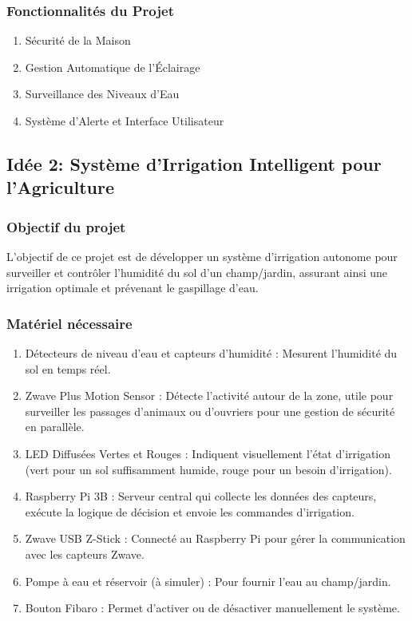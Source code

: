 \documentclass[a4paper ,10pt]{article}
\begin{document}
\subsubsection*{Fonctionnalités du Projet}

\begin{enumerate}
  \item Sécurité de la Maison
  \item Gestion Automatique de l'Éclairage
  \item Surveillance des Niveaux d'Eau
  \item Système d'Alerte et Interface Utilisateur
\end{enumerate}

\newpage

\subsection*{Idée 2: Système d’Irrigation Intelligent pour l’Agriculture}

\subsubsection*{Objectif du projet}
L'objectif de ce projet est de développer un système d'irrigation autonome pour surveiller et contrôler l'humidité du sol d'un champ/jardin, assurant ainsi une irrigation optimale et prévenant le gaspillage d'eau.

\subsubsection*{Matériel nécessaire}

\begin{enumerate}
  \item Détecteurs de niveau d'eau et capteurs d'humidité : Mesurent l'humidité du sol en temps réel.
  \item Zwave Plus Motion Sensor : Détecte l'activité autour de la zone, utile pour surveiller les passages d’animaux ou d’ouvriers pour une gestion de sécurité en parallèle.
  \item LED Diffusées Vertes et Rouges : Indiquent visuellement l'état d'irrigation (vert pour un sol suffisamment humide, rouge pour un besoin d'irrigation).
  \item Raspberry Pi 3B : Serveur central qui collecte les données des capteurs, exécute la logique de décision et envoie les commandes d'irrigation.
  \item Zwave USB Z-Stick : Connecté au Raspberry Pi pour gérer la communication avec les capteurs Zwave.
  \item Pompe à eau et réservoir (à simuler) : Pour fournir l'eau au champ/jardin.
  \item Bouton Fibaro : Permet d’activer ou de désactiver manuellement le système.
\end{enumerate}
\end{document}
